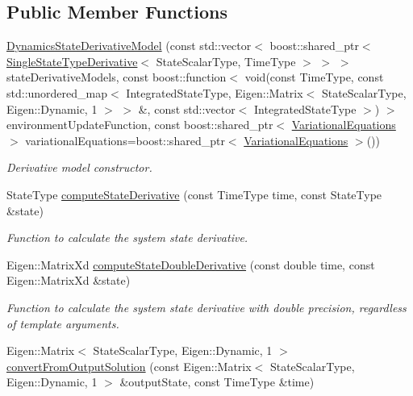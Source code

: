 \subsection*{Public Member Functions}
\begin{DoxyCompactItemize}
\item 
\hyperlink{classtudat_1_1propagators_1_1DynamicsStateDerivativeModel_a07b4ee8366a4024a352a871ddbef9c24}{Dynamics\+State\+Derivative\+Model} (const std\+::vector$<$ boost\+::shared\+\_\+ptr$<$ \hyperlink{classtudat_1_1propagators_1_1SingleStateTypeDerivative}{Single\+State\+Type\+Derivative}$<$ State\+Scalar\+Type, Time\+Type $>$ $>$ $>$ state\+Derivative\+Models, const boost\+::function$<$ void(const Time\+Type, const std\+::unordered\+\_\+map$<$ Integrated\+State\+Type, Eigen\+::\+Matrix$<$ State\+Scalar\+Type, Eigen\+::\+Dynamic, 1 $>$ $>$ \&, const std\+::vector$<$ Integrated\+State\+Type $>$) $>$ environment\+Update\+Function, const boost\+::shared\+\_\+ptr$<$ \hyperlink{classtudat_1_1propagators_1_1VariationalEquations}{Variational\+Equations} $>$ variational\+Equations=boost\+::shared\+\_\+ptr$<$ \hyperlink{classtudat_1_1propagators_1_1VariationalEquations}{Variational\+Equations} $>$())
\begin{DoxyCompactList}\small\item\em Derivative model constructor. \end{DoxyCompactList}\item 
State\+Type \hyperlink{classtudat_1_1propagators_1_1DynamicsStateDerivativeModel_a21c8ce5580f81720dd6ddce728ec0b48}{compute\+State\+Derivative} (const Time\+Type time, const State\+Type \&state)
\begin{DoxyCompactList}\small\item\em Function to calculate the system state derivative. \end{DoxyCompactList}\item 
Eigen\+::\+Matrix\+Xd \hyperlink{classtudat_1_1propagators_1_1DynamicsStateDerivativeModel_a1574f2acab780ba335cb8cbb9f6bbe85}{compute\+State\+Double\+Derivative} (const double time, const Eigen\+::\+Matrix\+Xd \&state)
\begin{DoxyCompactList}\small\item\em Function to calculate the system state derivative with double precision, regardless of template arguments. \end{DoxyCompactList}\item 
Eigen\+::\+Matrix$<$ State\+Scalar\+Type, Eigen\+::\+Dynamic, 1 $>$ \hyperlink{classtudat_1_1propagators_1_1DynamicsStateDerivativeModel_a1868ccb38a3ff5a7129dcf686d8aea8a}{convert\+From\+Output\+Solution} (const Eigen\+::\+Matrix$<$ State\+Scalar\+Type, Eigen\+::\+Dynamic, 1 $>$ \&output\+State, const Time\+Type \&time)

\end{DoxyCompactItemize}
